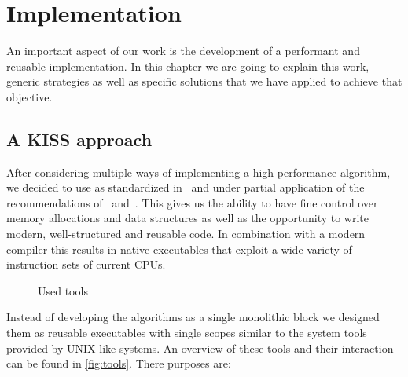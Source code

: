 \chapter{Implementation}
\label{ch:implementation}

An important aspect of our work is the development of a performant and reusable implementation. In this chapter we are going to explain this work, generic strategies as well as specific solutions that we have applied to achieve that objective.



\section{A KISS approach}
\label{sec:implementation:approach}

After considering multiple ways of implementing a high-performance algorithm, we decided to use  as standardized in~\cite{cpp14} and under partial application of the recommendations of~\cite{effective_cpp} and~\cite{effective_cpp2}. This gives us the ability to have fine control over memory allocations and data structures as well as the opportunity to write modern, well-structured and reusable code. In combination with a modern compiler this results in native executables that exploit a wide variety of instruction sets of current CPUs.

\begin{sidewaysfigure}
    \centering
    
    \caption[Overview over used tools]{Used tools}\label{fig:tools}
\end{sidewaysfigure}

Instead of developing the algorithms as a single monolithic block we designed them as reusable executables with single scopes similar to the system tools provided by UNIX-like systems. An overview of these tools and their interaction can be found in \autoref{fig:tools}. There purposes are:

